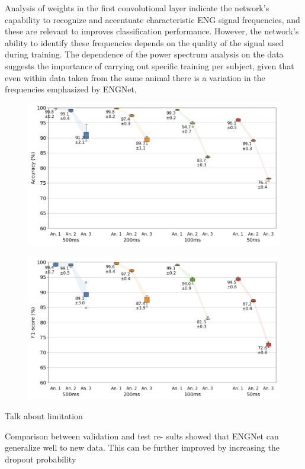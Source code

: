 \documentclass{Configuration_Files/PoliMi3i_thesis}
\begin{document}
Analysis of weights in the first convolutional layer indicate the network’s capability to recognize and accentuate characteristic ENG signal frequencies, and these are relevant to improves classification performance. However, the network’s ability to identify these frequencies depends on the quality of the signal used during training. The dependence of the power spectrum analysis on the data suggests the importance of carrying out specific training per subject, given that even within data taken from the same animal there is a variation in the frequencies emphasized by ENGNet,

\begin{figure}[H]
	\includegraphics[scale=0.25]{engNet_accuracy.png}
	\centering
	\end{figure}
	
	\begin{figure}[H]
		\includegraphics[scale=0.3]{engNet_f1score.png}
		\centering
		\end{figure}

Talk about limitation

Comparison between validation and test re- sults showed that ENGNet can generalize well to new data. This can be further improved by increasing the dropout probability
\end{document}
